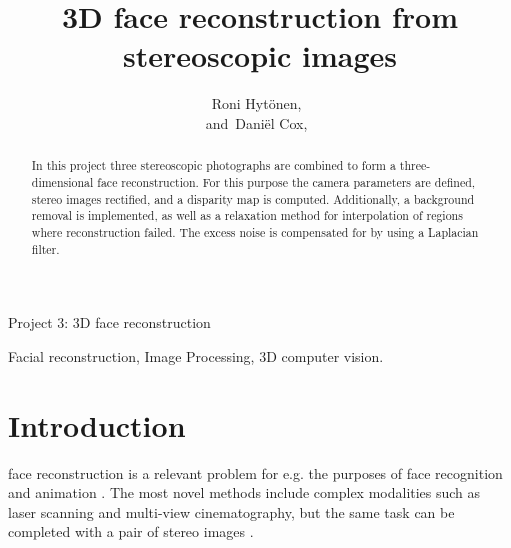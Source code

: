 \documentclass[journal]{IEEEtran}
\begin{document}
%
\title{3D face reconstruction from stereoscopic images}
%

\author{Roni Hyt\"{o}nen,~  
      
        and~Dani\"el Cox,~%

}



%
{Project 3: 3D face reconstruction}


\maketitle


\begin{abstract}
In this project three stereoscopic photographs are combined to form a three-dimensional face reconstruction. 
For this purpose the camera parameters are defined, stereo images rectified, and a disparity map is computed.
Additionally, a background removal is implemented, as well as a relaxation method for interpolation of regions where reconstruction failed.
The excess noise is compensated for by using a Laplacian filter.

\end{abstract}

\begin{IEEEkeywords}
Facial reconstruction, Image Processing, 3D computer vision.
\end{IEEEkeywords}


\IEEEpeerreviewmaketitle



\section{Introduction}
% 
% 
% 
% 
 face reconstruction is a relevant problem for e.g. the purposes of face recognition and animation \cite{3D_Peng}.
The most novel methods include complex modalities such as laser scanning and multi-view cinematography, but the same task can be completed with a pair of stereo images \cite{Creation_Krutikova}.
\end{document}
